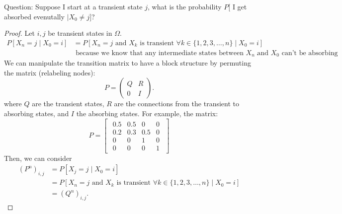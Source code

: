 \documentclass[a4paper]{article}
\begin{document}
\begin{remark}
  Question: Suppose I start at a transient state $j$, what is the probability  $P[$ I get absorbed evenutally  $\mid X_0 \neq j]$?

  \begin{proof}
    Let $i,j$ be transient states in $\Omega$. 
   \begin{align*}
     P[X_n = j \mid X_0 = i] &= P[X_n = j \text{ and $X_k$ is transient  $\forall k \in \{1,2,3, \ldots,n\}$} \mid X_0 = i] \\
                             &\text{ because we know that any intermediate states between $X_n$ and  $X_0$ can't be absorbing} 
   .\end{align*} 
   We can manipulate the transition matrix to have a block structure by permuting the matrix (relabeling nodes):
   \[
     P = \begin{pmatrix} Q & R \\ 0 & I \end{pmatrix}
   .\]  
   where $Q$ are the transient states, $R $ are the connections from the transient to absorbing states, and  $I$ the absorbing states.  For example, the matrix:
\[
P = \begin{bmatrix}
\begin{array}{cc|cc}
0.5 & 0.5 & 0 & 0 \\
0.2 & 0.3 & 0.5 & 0 \\
\hline
0 & 0 & 1 & 0 \\
0 & 0 & 0 & 1
\end{array}
\end{bmatrix}
\]
Then, we can consider
\begin{align*}
  (P^{n})_{i,j} &= P[X_j = j \mid X_0 = i] \\
                &= P[X_n = j \text{ and $X_k$ is transient  $\forall k \in \{1,2,3, \ldots,n\}$} \mid X_0 = i] \\
                &= (Q^{n})_{i,j}
.\end{align*}
  \end{proof}
\end{remark}
\end{document}
